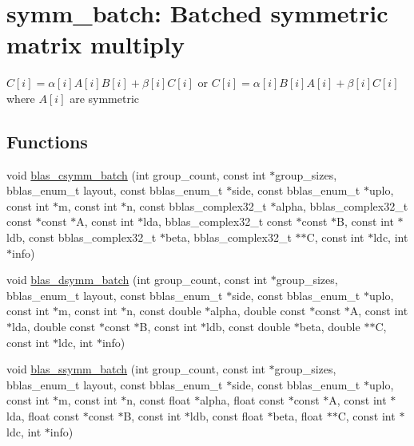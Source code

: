 \hypertarget{group__symm__batch}{}\section{symm\+\_\+batch\+: Batched symmetric matrix multiply}
\label{group__symm__batch}


$ C[i] = \alpha[i] A[i] B[i] + \beta[i] C[i] $ or $ C[i] = \alpha[i] B[i] A[i] + \beta[i] C[i] $ where $ A[i] $ are symmetric  


\subsection*{Functions}
\begin{DoxyCompactItemize}
\item 
void \mbox{\hyperlink{group__symm__batch_ga6027013e9d6c2fe5dfb68cf1436faf82}{blas\+\_\+csymm\+\_\+batch}} (int group\+\_\+count, const int $\ast$group\+\_\+sizes, bblas\+\_\+enum\+\_\+t layout, const bblas\+\_\+enum\+\_\+t $\ast$side, const bblas\+\_\+enum\+\_\+t $\ast$uplo, const int $\ast$m, const int $\ast$n, const bblas\+\_\+complex32\+\_\+t $\ast$alpha, bblas\+\_\+complex32\+\_\+t const $\ast$const $\ast$A, const int $\ast$lda, bblas\+\_\+complex32\+\_\+t const $\ast$const $\ast$B, const int $\ast$ldb, const bblas\+\_\+complex32\+\_\+t $\ast$beta, bblas\+\_\+complex32\+\_\+t $\ast$$\ast$C, const int $\ast$ldc, int $\ast$info)
\item 
void \mbox{\hyperlink{group__symm__batch_ga86283c1c99ac1dfc211324022d62d182}{blas\+\_\+dsymm\+\_\+batch}} (int group\+\_\+count, const int $\ast$group\+\_\+sizes, bblas\+\_\+enum\+\_\+t layout, const bblas\+\_\+enum\+\_\+t $\ast$side, const bblas\+\_\+enum\+\_\+t $\ast$uplo, const int $\ast$m, const int $\ast$n, const double $\ast$alpha, double const $\ast$const $\ast$A, const int $\ast$lda, double const $\ast$const $\ast$B, const int $\ast$ldb, const double $\ast$beta, double $\ast$$\ast$C, const int $\ast$ldc, int $\ast$info)
\item 
void \mbox{\hyperlink{group__symm__batch_ga3b3eaaa6290ce39fd588f05737a27524}{blas\+\_\+ssymm\+\_\+batch}} (int group\+\_\+count, const int $\ast$group\+\_\+sizes, bblas\+\_\+enum\+\_\+t layout, const bblas\+\_\+enum\+\_\+t $\ast$side, const bblas\+\_\+enum\+\_\+t $\ast$uplo, const int $\ast$m, const int $\ast$n, const float $\ast$alpha, float const $\ast$const $\ast$A, const int $\ast$lda, float const $\ast$const $\ast$B, const int $\ast$ldb, const float $\ast$beta, float $\ast$$\ast$C, const int $\ast$ldc, int $\ast$info)
$$
\end{DoxyCompactItemize}
